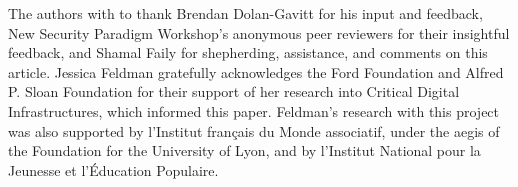 The authors with to thank Brendan Dolan-Gavitt for his input and feedback, New Security Paradigm Workshop’s anonymous peer reviewers for their insightful feedback, and Shamal Faily for shepherding, assistance, and comments on this article. Jessica Feldman gratefully acknowledges the Ford Foundation and Alfred P. Sloan Foundation for their support of her research into Critical Digital Infrastructures, which informed this paper. Feldman’s research with this project was also supported by l’Institut français du Monde associatif, under the aegis of the Foundation for the University of Lyon, and by l’Institut National pour la Jeunesse et l'Éducation Populaire.